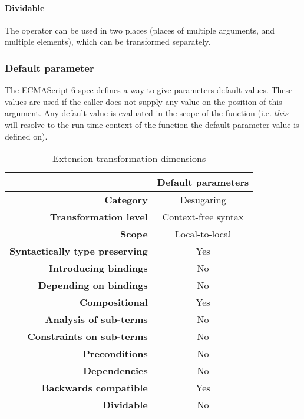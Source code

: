 \documentclass[10pt,a4paper]{article}
\begin{document}
\paragraph{Dividable}
The operator can be used in two places (places of multiple arguments, and multiple elements), which can be transformed separately.

\subsubsection{Default parameter}
The ECMAScript 6 spec defines a way to give parameters default values\cite[9.2.12]{SpecJS}. These values are used if the caller does not supply any value on the position of this argument. Any default value is evaluated in the scope of the function (i.e. $this$ will resolve to the run-time context of the function the default parameter value is defined on).

\begin{table}[H]
\centering
\caption{Extension transformation dimensions}
\label{default-parameter-table}
\begin{tabular}{@{}rc@{}}
\toprule
                                       & \multicolumn{1}{l}{\textbf{Default parameters}} \\ \midrule
\textbf{Category}                      & Desugaring
\\
\textbf{Transformation level}          & Context-free syntax                          \\
\textbf{Scope}                         & Local-to-local                               \\
\textbf{Syntactically type preserving} & Yes                                          \\
\textbf{Introducing bindings}          & No                                          \\%
\textbf{Depending on bindings}         & No                                           \\
\textbf{Compositional}                 & Yes                                          \\
\textbf{Analysis of sub-terms}          & No                                          \\
\textbf{Constraints on sub-terms}       & No                                           \\
\textbf{Preconditions}                 & No                                          \\
\textbf{Dependencies}                  & No                                           \\
\textbf{Backwards compatible}          & Yes                                          \\
\textbf{Dividable}                     & No                                           \\ \bottomrule
\end{tabular}
\end{table}
\end{document}
